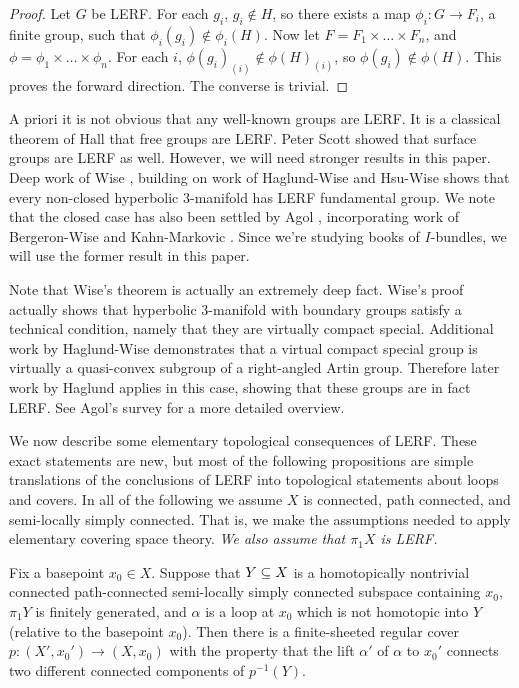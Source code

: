 \begin{proof}

Let $G$ be LERF. For each $g_i$, $g_i \notin H$, so there exists a map $\phi_i
\colon G \to F_i$, a finite group, such that $\phi_i(g_i) \notin \phi_i(H)$.
Now let $F = F_1 \times \dots \times F_n$, and $\phi = \phi_1 \times \dots
\times \phi_n$.  For each $i$, $\phi(g_i)_{(i)} \notin \phi(H)_{(i)}$, so
$\phi(g_i) \notin \phi(H)$.  This proves the forward direction.  The converse
is trivial.

\end{proof}

A priori it is not obvious that any well-known groups are LERF. It is
a classical theorem of Hall \cite{Hall} that free groups are LERF. Peter Scott
\cite{Scott} showed that surface groups are LERF as well. However, we will need
stronger results in this paper. Deep work of Wise \cite{Wise}, building on work
of Haglund-Wise \cite{HaglundWise} and Hsu-Wise \cite{HsuWise} shows that every
non-closed hyperbolic 3-manifold has LERF fundamental group.  We note that the
closed case has also been settled by Agol \cite{Agol}, incorporating work of
Bergeron-Wise \cite{BergeronWise} and Kahn-Markovic \cite{KM}. Since we're
studying books of $I$-bundles, we will use the former result in this paper.

Note that Wise's theorem is actually an extremely deep fact. Wise's proof
actually shows that hyperbolic 3-manifold with boundary groups satisfy
a technical condition, namely that they are virtually compact special.
Additional work by Haglund-Wise \cite{HaglundWise1}
demonstrates that a virtual compact special group is virtually a quasi-convex
subgroup of a right-angled Artin group. Therefore later work by Haglund
\cite{Haglund} applies in this case, showing that these groups are in fact
LERF. See Agol's survey \cite{Agolsurvey} for a more detailed overview.

We now describe some elementary topological consequences of LERF. These exact
statements are new, but most of the following propositions are simple
translations of the conclusions of LERF into topological statements about loops
and covers. In all of the following we assume $X$ is connected, path connected,
and semi-locally simply connected. That is, we make the assumptions needed to
apply elementary covering space theory. \emph{We also assume that $\pi_1X$ is
LERF.}


\begin{prop}\label{P:lerf1}

Fix a basepoint $x_0 \in X$.  Suppose that $Y \subseteq X$ is a homotopically
nontrivial connected path-connected semi-locally simply connected subspace
containing $x_0$, $\pi_1Y$ is finitely generated, and $\alpha$ is a loop at
$x_0$ which is not homotopic into $Y$ (relative to the basepoint $x_0$). Then
there is a finite-sheeted regular cover $p \colon (X',x_0') \to (X,x_0)$ with
the property that the lift $\alpha'$ of $\alpha$ to $x_0'$ connects two
different connected components of $p^{-1}(Y)$.

\end{prop}

